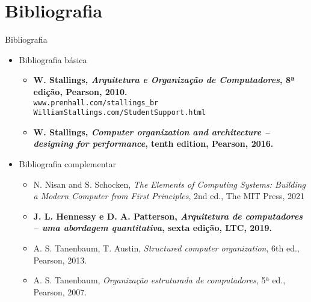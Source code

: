    \section[ slide = true]{Bibliografia}
      \begin{slide}[toc=]{Bibliografia}
         \begin{itemize}
            \item Bibliografia básica
            \begin{itemize}
               \item \textbf{W. Stallings, \emph{Arquitetura e Organização de Computadores}, 8ª edição, Pearson,  2010.}\\ \texttt{www.prenhall.com/stallings\_br}\\ \texttt{WilliamStallings.com/StudentSupport.html}
               \item \textbf{W. Stallings, \emph{Computer organization and architecture -- designing for performance}, tenth edition, Pearson,  2016.}
            \end{itemize}
            \item Bibliografia complementar
            \begin{itemize}
               \item {N. Nisan and S. Schocken, \emph{The Elements of Computing Systems: Building a Modern Computer from First Principles}, 2nd ed., The MIT Press, 2021}
	       \item \textbf{J. L. Hennessy e D. A. Patterson, \emph{Arquitetura de computadores -- uma abordagem quantitativa}, sexta edição, LTC, 2019.}
               \item {A. S. Tanenbaum, T. Austin, \emph{Structured computer organization}, 6th ed., Pearson, 2013.} 
               \item {A. S. Tanenbaum, \emph{Organização estruturada de computadores}, 5ª ed., Pearson, 2007.} 
            \end{itemize}
         \end{itemize}
      \end{slide}

